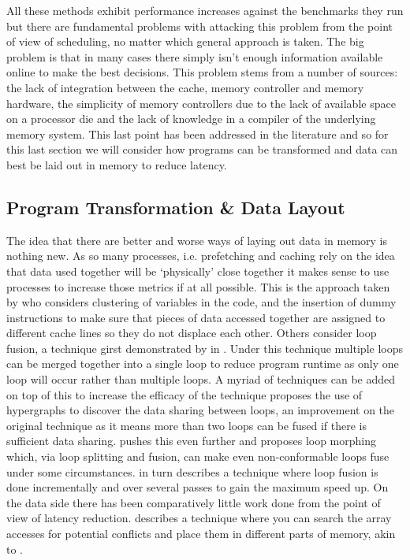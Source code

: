 All these methods exhibit performance increases against the benchmarks they run but there are fundamental problems with attacking this problem from the point of view of scheduling, no matter which general approach is taken. The big problem is that in many cases there simply isn't enough information available online to make the best decisions. This problem stems from a number of sources: the lack of integration between the cache, memory controller and memory hardware, the simplicity of memory controllers due to the lack of available space on a processor die and the lack of knowledge in a compiler of the underlying memory system. This last point has been addressed in the literature and so for this last section we will consider how programs can be transformed and data can best be laid out in memory to reduce latency. 

\subsection{Program Transformation \& Data Layout}

The idea that there are better and worse ways of laying out data in memory is nothing new. As so many processes, i.e. prefetching and caching rely on the idea that data used together will be `physically' close together it makes sense to use processes to increase those metrics if at all possible. This is the approach taken by \citet{pandaMemoryDataOrganization1997} who considers clustering of variables in the code, and the insertion of dummy instructions to make sure that pieces of data accessed together are assigned to different cache lines so they do not displace each other. Others consider loop fusion, a technique girst demonstrated by \citet{gaoCollectiveLoopFusion1993} in \citeyear{gaoCollectiveLoopFusion1993}. Under this technique multiple loops can be merged together into a single loop to reduce program runtime as only one loop will occur rather than multiple loops. A myriad of techniques can be added on top of this to increase the efficacy of the technique \citet{chendingMemoryBandwidthBottleneck2000} proposes the use of hypergraphs to discover the data sharing between loops, an improvement on the original technique as it means more than two loops can be fused if there is sufficient data sharing. \citet{gomezOptimizingMemoryBandwidth2004} pushes this even further and proposes loop morphing which, via loop splitting and fusion, can make even non-conformable loops fuse under some circumstances. \citet{marchalOptimizingMemoryBandwidth2004} in turn describes a technique where loop fusion is done incrementally and over several passes to gain the maximum speed up. On the data side there has been comparatively little work done from the point of view of latency reduction. \citet{qaziOptimizationAccessLatency2016} describes a technique where you can search the array accesses for potential conflicts and place them in different parts of memory, akin to \citet{pandaMemoryDataOrganization1997}. 

